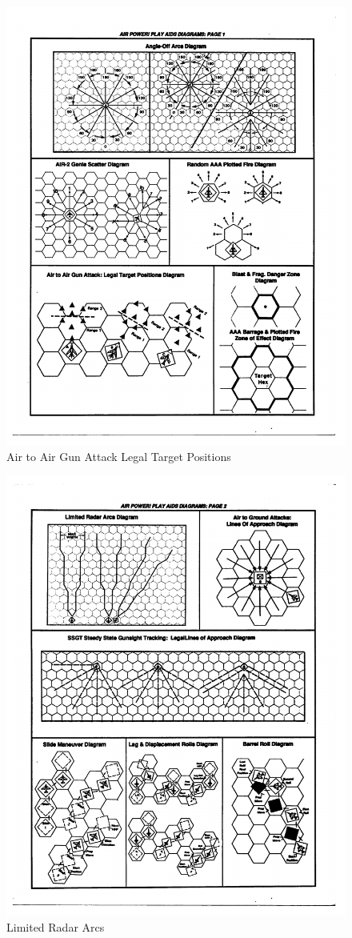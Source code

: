 \documentclass[10pt]{article}
\begin{document}
\begin{figure}
\centering
\caption{Air to Air Gun Attack Legal Target Positions}
\medskip
\includegraphics[width=0.4\linewidth]{figures/aids-gun-attack.pdf}
\end{figure}

\begin{figure}
\centering
\caption{Limited Radar Arcs}
\medskip
\includegraphics[width=1.0\linewidth]{figures/aids-limited-arc.pdf}
\end{figure}
\end{document}
